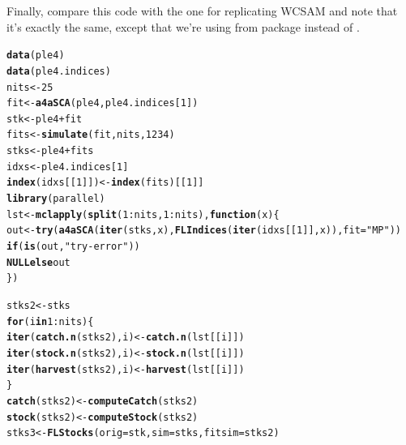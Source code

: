 \documentclass[a4paper,english,10pt]{article}\usepackage[]{graphicx}\usepackage[]{color}
\makeatletter
\newcommand{\hlnum}[1]{\textcolor[rgb]{0.686,0.059,0.569}{#1}}%
\newcommand{\hlstr}[1]{\textcolor[rgb]{0.192,0.494,0.8}{#1}}%
\newcommand{\hlopt}[1]{\textcolor[rgb]{0,0,0}{#1}}%
\newcommand{\hlstd}[1]{\textcolor[rgb]{0.345,0.345,0.345}{#1}}%
\newcommand{\hlkwa}[1]{\textcolor[rgb]{0.161,0.373,0.58}{\textbf{#1}}}%
\newcommand{\hlkwb}[1]{\textcolor[rgb]{0.69,0.353,0.396}{#1}}%
\newcommand{\hlkwc}[1]{\textcolor[rgb]{0.333,0.667,0.333}{#1}}%
\newcommand{\hlkwd}[1]{\textcolor[rgb]{0.737,0.353,0.396}{\textbf{#1}}}%
\newenvironment{kframe}{%
 \def\at@end@of@kframe{}%
 \ifinner\ifhmode%
  \def\at@end@of@kframe{\end{minipage}}%
  \begin{minipage}{\columnwidth}%
 \fi\fi%
 \def\FrameCommand##1{\hskip\@totalleftmargin \hskip-\fboxsep
 \colorbox{shadecolor}{##1}\hskip-\fboxsep
     \hskip-\linewidth \hskip-\@totalleftmargin \hskip\columnwidth}%
 \MakeFramed {\advance\hsize-\width
   \@totalleftmargin\z@ \linewidth\hsize
   \@setminipage}}%
 {\par\unskip\endMakeFramed%
 \at@end@of@kframe}
\newenvironment{knitrout}{}{} %
\makeatother
\begin{document}
Finally, compare this code with the one for replicating WCSAM and note that it's exactly the same, except that we're using  from package  instead of .

\begin{knitrout}
\color{fgcolor}\begin{kframe}
\begin{alltt}
\hlkwd{data}\hlstd{(ple4)}
\hlkwd{data}\hlstd{(ple4.indices)}
\hlstd{nits} \hlkwb{<-} \hlnum{25}
\hlstd{fit} \hlkwb{<-} \hlkwd{a4aSCA}\hlstd{(ple4, ple4.indices[}\hlnum{1}\hlstd{])}
\hlstd{stk} \hlkwb{<-} \hlstd{ple4} \hlopt{+} \hlstd{fit}
\hlstd{fits} \hlkwb{<-} \hlkwd{simulate}\hlstd{(fit, nits,} \hlnum{1234}\hlstd{)}
\hlstd{stks} \hlkwb{<-} \hlstd{ple4} \hlopt{+} \hlstd{fits}
\hlstd{idxs} \hlkwb{<-} \hlstd{ple4.indices[}\hlnum{1}\hlstd{]}
\hlkwd{index}\hlstd{(idxs[[}\hlnum{1}\hlstd{]])} \hlkwb{<-} \hlkwd{index}\hlstd{(fits)[[}\hlnum{1}\hlstd{]]}
\hlkwd{library}\hlstd{(parallel)}
\hlstd{lst} \hlkwb{<-} \hlkwd{mclapply}\hlstd{(}\hlkwd{split}\hlstd{(}\hlnum{1}\hlopt{:}\hlstd{nits,} \hlnum{1}\hlopt{:}\hlstd{nits),} \hlkwa{function}\hlstd{(}\hlkwc{x}\hlstd{) \{}
    \hlstd{out} \hlkwb{<-} \hlkwd{try}\hlstd{(}\hlkwd{a4aSCA}\hlstd{(}\hlkwd{iter}\hlstd{(stks, x),} \hlkwd{FLIndices}\hlstd{(}\hlkwd{iter}\hlstd{(idxs[[}\hlnum{1}\hlstd{]], x)),} \hlkwc{fit} \hlstd{=} \hlstr{"MP"}\hlstd{))}
    \hlkwa{if} \hlstd{(}\hlkwd{is}\hlstd{(out,} \hlstr{"try-error"}\hlstd{))}
        \hlkwa{NULL else} \hlstd{out}
\hlstd{\})}

\hlstd{stks2} \hlkwb{<-} \hlstd{stks}
\hlkwa{for} \hlstd{(i} \hlkwa{in} \hlnum{1}\hlopt{:}\hlstd{nits) \{}
    \hlkwd{iter}\hlstd{(}\hlkwd{catch.n}\hlstd{(stks2), i)} \hlkwb{<-} \hlkwd{catch.n}\hlstd{(lst[[i]])}
    \hlkwd{iter}\hlstd{(}\hlkwd{stock.n}\hlstd{(stks2), i)} \hlkwb{<-} \hlkwd{stock.n}\hlstd{(lst[[i]])}
    \hlkwd{iter}\hlstd{(}\hlkwd{harvest}\hlstd{(stks2), i)} \hlkwb{<-} \hlkwd{harvest}\hlstd{(lst[[i]])}
\hlstd{\}}
\hlkwd{catch}\hlstd{(stks2)} \hlkwb{<-} \hlkwd{computeCatch}\hlstd{(stks2)}
\hlkwd{stock}\hlstd{(stks2)} \hlkwb{<-} \hlkwd{computeStock}\hlstd{(stks2)}
\hlstd{stks3} \hlkwb{<-} \hlkwd{FLStocks}\hlstd{(}\hlkwc{orig} \hlstd{= stk,} \hlkwc{sim} \hlstd{= stks,} \hlkwc{fitsim} \hlstd{= stks2)}
\end{alltt}
\end{kframe}
\end{knitrout}
\end{document}
